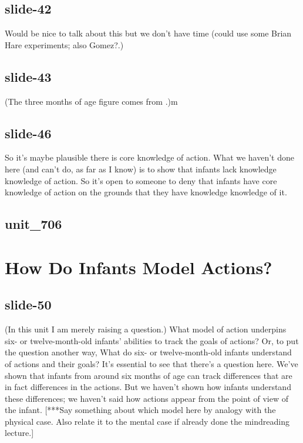 \documentclass[12pt,\papersize]{extarticle}
\begin{document}
 
\subsection{slide-42}
Would be nice to talk about this but we don't have time (could use some Brian Hare experiments; also Gomez?.)
 
 
\subsection{slide-43}
(The three months of age figure comes from \citet{Sommerville:2005te}.)m
 
 
\subsection{slide-46}
So it's maybe plausible there is core knowledge of action.
What we haven't done here (and can't do, as far as I know) is to show that infants lack knowledge knowledge of action.
So it's open to someone to deny that infants have core knowledge of action on the grounds that they have knowledge knowledge of it.
 
 
\subsection{unit\_706}
 
\section{How Do Infants Model Actions?}
 
 
\subsection{slide-50}
(In this unit I am merely raising a question.)
What model of action underpins six- or twelve-month-old infants’ abilities to track the goals of actions?
Or, to put the question another way, What do six- or twelve-month-old infants understand of actions and their goals?
It's essential to see that there's a question here. We've shown that infants from around six months of age can track differences that are in fact differences in the actions. But we haven't shown how infants understand these differences; we haven't said how actions appear from the point of view of the infant.
[***Say something about which model here by analogy with the physical case. Also relate it to the mental case if already done the mindreading lecture.]
 
 
\end{document}
